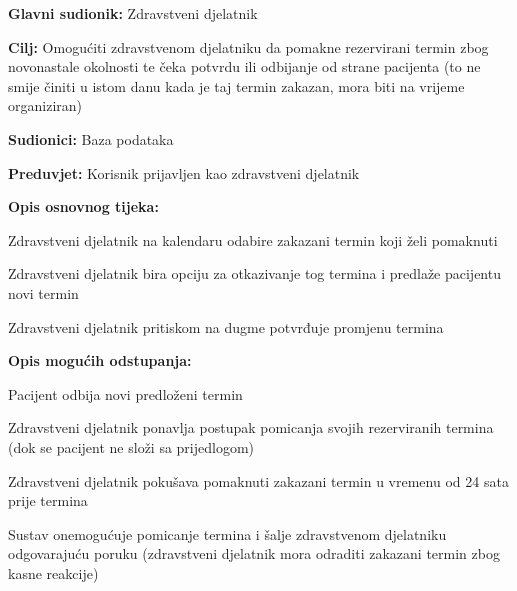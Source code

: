 					
					\noindent {}
					\begin{packed_item}
						
						\item \textbf{Glavni sudionik: }Zdravstveni djelatnik
						\item  \textbf{Cilj:} Omogućiti zdravstvenom djelatniku da pomakne rezervirani termin zbog novonastale okolnosti te čeka potvrdu ili odbijanje od strane pacijenta (to ne smije činiti u istom danu kada je taj termin zakazan, mora biti na vrijeme organiziran)
						\item  \textbf{Sudionici:} Baza podataka
						\item  \textbf{Preduvjet:} Korisnik prijavljen kao zdravstveni djelatnik
						\item  \textbf{Opis osnovnog tijeka:}
						
						\item[] \begin{packed_enum}
							
							\item Zdravstveni djelatnik na kalendaru odabire zakazani termin koji želi pomaknuti
							\item Zdravstveni djelatnik bira opciju za otkazivanje tog termina i predlaže pacijentu novi termin
							\item Zdravstveni djelatnik pritiskom na dugme potvrđuje promjenu termina
						\end{packed_enum}
						
						\item  \textbf{Opis mogućih odstupanja:}
						
						\item[] \begin{packed_item}
							
							\item[2.a] Pacijent odbija novi predloženi termin
							\item[] \begin{packed_enum}
								
								\item Zdravstveni djelatnik ponavlja postupak pomicanja svojih rezerviranih termina (dok se pacijent ne složi sa prijedlogom)
								
							\end{packed_enum}
							\item[2.a] Zdravstveni djelatnik pokušava pomaknuti zakazani termin u vremenu od 24 sata prije termina
							\item[] \begin{packed_enum}
								
								\item Sustav onemogućuje pomicanje termina i šalje zdravstvenom djelatniku odgovarajuću poruku (zdravstveni djelatnik mora odraditi zakazani termin zbog kasne reakcije)
								
							\end{packed_enum}
							
						\end{packed_item}
					\end{packed_item}
					
